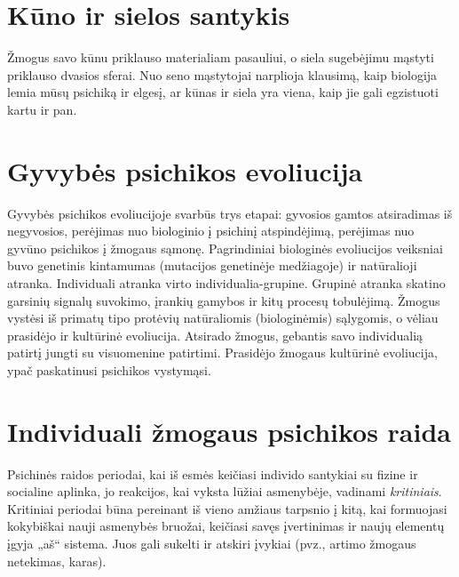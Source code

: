 \section{Kūno ir sielos santykis}

\label{tema:kuno_sielos_santykis}

Žmogus savo kūnu priklauso materialiam pasauliui, o siela sugebėjimu mąstyti
priklauso dvasios sferai. Nuo seno mąstytojai narplioja klausimą, kaip 
biologija lemia mūsų psichiką ir elgesį, ar kūnas ir siela yra viena, kaip 
jie gali egzistuoti kartu ir pan.

\section{Gyvybės psichikos evoliucija}

\label{tema:gyvybes_psichikos_evoliucija}

Gyvybės psichikos evoliucijoje svarbūs trys etapai: gyvosios gamtos 
atsiradimas iš negyvosios, perėjimas nuo biologinio į psichinį atspindėjimą,
perėjimas nuo gyvūno psichikos į žmogaus sąmonę.
Pagrindiniai biologinės evoliucijos veiksniai buvo genetinis kintamumas
(mutacijos genetinėje medžiagoje) ir natūralioji atranka. Individuali 
atranka virto individualia-grupine. Grupinė atranka skatino garsinių signalų
suvokimo, įrankių gamybos ir kitų procesų tobulėjimą. Žmogus vystėsi iš 
primatų tipo protėvių natūraliomis (biologinėmis) sąlygomis, o vėliau 
prasidėjo ir kultūrinė evoliucija. Atsirado žmogus, gebantis savo 
individualią patirtį jungti su visuomenine patirtimi. Prasidėjo žmogaus
kultūrinė evoliucija, ypač paskatinusi psichikos vystymąsi.

\section{Individuali žmogaus psichikos raida}

\label{tema:psichikos_raida}

Psichinės raidos periodai, kai iš esmės keičiasi individo santykiai
su fizine ir socialine aplinka, jo reakcijos, kai vyksta lūžiai asmenybėje,
vadinami \emph{kritiniais}. Kritiniai periodai būna pereinant iš vieno 
amžiaus tarpsnio į kitą, kai formuojasi kokybiškai nauji asmenybės 
bruožai, keičiasi savęs įvertinimas ir naujų elementų įgyja „aš“ sistema. %
Juos gali sukelti ir atskiri įvykiai (pvz., artimo žmogaus netekimas, karas).


